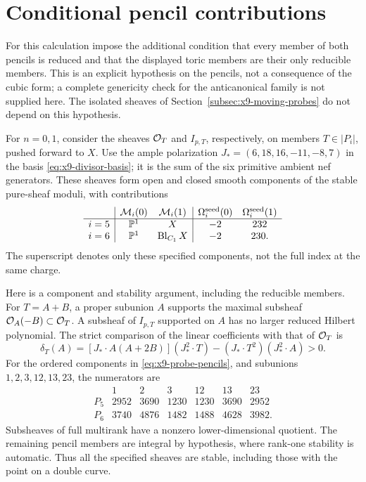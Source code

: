 \section{Conditional pencil contributions}
\label{app:pencil}
For this calculation impose the additional condition that every member
of both pencils is reduced and that the displayed toric members are
their only reducible members. This is an explicit hypothesis on the
pencils, not a consequence of the cubic form; a complete genericity
check for the anticanonical family is not supplied here. The isolated sheaves of Section~\ref{subsec:x9-moving-probes}
do not depend on this hypothesis.

For $n=0,1$, consider the sheaves $\mathcal O_T$ and $I_{p,T}$, respectively,
on members $T\in|P_i|$, pushed forward to $X$. Use the ample
polarization $J_*=(6,18,16,-11,-8,7)$ in the basis
\eqref{eq:x9-divisor-basis}; it is the sum of the six primitive ambient
nef generators. These sheaves form open and closed smooth components
of the stable pure-sheaf moduli, with contributions
\begin{equation}
 \begin{array}{c|cc|cc}
 &\mathcal M_i(0)&\mathcal M_i(1)&
 \Omega_i^{\rm seed}(0)&\Omega_i^{\rm seed}(1)\\\hline
 i=5&\mathbb P^1&X&-2&232\\
 i=6&\mathbb P^1&\operatorname{Bl}_{C_1}X&-2&230 .
 \end{array}
 \label{eq:x9-moving-seeds}
\end{equation}
The superscript denotes only these specified components, not the
full index at the same charge.

Here is a component and stability argument, including the reducible
members. For $T=A+B$, a proper subunion $A$ supports the maximal
subsheaf $\mathcal O_A(-B)\subset\mathcal O_T$. A subsheaf of $I_{p,T}$ supported
on $A$ has no larger reduced Hilbert polynomial. The strict comparison
of the linear coefficients with that of $\mathcal O_T$ is
\begin{equation}
 \delta_T(A)=
 [J_*\cdot A(A+2B)](J_*^2\cdot T)
 -(J_*\cdot T^2)(J_*^2\cdot A)>0.
 \label{eq:x9-probe-stability}
\end{equation}
For the ordered components in \eqref{eq:x9-probe-pencils}, and subunions
$1,2,3,12,13,23$, the numerators are
\begin{equation}
 \begin{array}{c|rrrrrr}
 &1&2&3&12&13&23\\\hline
 P_5&2952&3690&1230&1230&3690&2952\\
 P_6&3740&4876&1482&1488&4628&3982 .
 \end{array}
 \label{eq:x9-probe-stability-data}
\end{equation}
Subsheaves of full multirank have a nonzero lower-dimensional quotient.
The remaining pencil members are integral by hypothesis, where rank-one
stability is automatic. Thus all the specified sheaves are stable,
including those with the point on a double curve.

